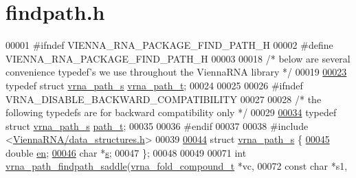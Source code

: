 \hypertarget{findpath_8h_source}{}\section{findpath.\+h}
\label{findpath_8h_source}

\begin{DoxyCode}
00001 \textcolor{preprocessor}{#ifndef VIENNA\_RNA\_PACKAGE\_FIND\_PATH\_H}
00002 \textcolor{preprocessor}{#define VIENNA\_RNA\_PACKAGE\_FIND\_PATH\_H}
00003 
00018 \textcolor{comment}{/* below are several convenience typedef's we use throughout the ViennaRNA library */}
00019 
\hyperlink{group__direct__paths_ga818d4f3d1cf8723d6905990b08d909fe}{00023} \textcolor{keyword}{typedef} \textcolor{keyword}{struct }\hyperlink{group__direct__paths_structvrna__path__s}{vrna\_path\_s} \hyperlink{group__direct__paths_structvrna__path__s}{vrna\_path\_t};
00024 
00025 
00026 \textcolor{preprocessor}{#ifndef VRNA\_DISABLE\_BACKWARD\_COMPATIBILITY}
00027 
00028 \textcolor{comment}{/* the following typedefs are for backward compatibility only */}
00029 
\hyperlink{group__direct__paths_gab6b8737d5377e70a7815d04aae7fd884}{00034} \textcolor{keyword}{typedef} \textcolor{keyword}{struct }\hyperlink{group__direct__paths_structvrna__path__s}{vrna\_path\_s} \hyperlink{group__direct__paths_structvrna__path__s}{path\_t};
00035 
00036 \textcolor{preprocessor}{#endif}
00037 
00038 \textcolor{preprocessor}{#include <\hyperlink{data__structures_8h}{ViennaRNA/data\_structures.h}>}
00039 
\hyperlink{group__direct__paths}{00044} \textcolor{keyword}{struct }\hyperlink{group__direct__paths_structvrna__path__s}{vrna\_path\_s} \{
\hyperlink{group__direct__paths_ac25160bf31d28097358278f367e41227}{00045}   \textcolor{keywordtype}{double}  \hyperlink{group__direct__paths_ac25160bf31d28097358278f367e41227}{en}; 
\hyperlink{group__direct__paths_a141b70a59cb81d10bc65bbb7a0f6db77}{00046}   \textcolor{keywordtype}{char}    *\hyperlink{group__direct__paths_a141b70a59cb81d10bc65bbb7a0f6db77}{s}; 
00047 \};
00048 
00049 
00071 \textcolor{keywordtype}{int} \hyperlink{group__direct__paths_gad611574a76593e26021f177e7854b6b4}{vrna\_path\_findpath\_saddle}(\hyperlink{group__fold__compound_structvrna__fc__s}{vrna\_fold\_compound\_t}  *vc,
00072                               \textcolor{keyword}{const} \textcolor{keywordtype}{char}            *s1,

\end{DoxyCode}
